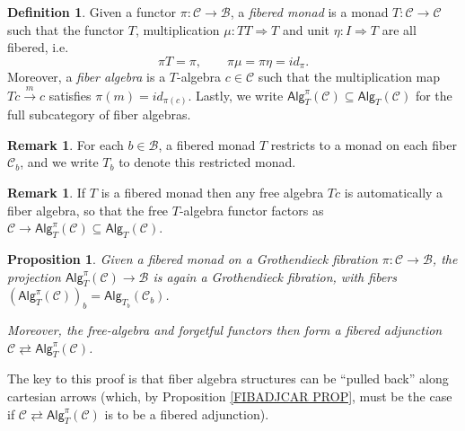 \documentclass[a4paper,10pt
]{article}%
\numberwithin{equation}{section}
\numberwithin{figure}{section}
\newtheorem{proposition}[equation]{Proposition}%
\theoremstyle{definition} %
\newtheorem{definition}[equation]{Definition}%
\newtheorem{remark}[equation]{Remark}%
\newcommand{\1}{\ensuremath{\mathbbm 1}}%
\begin{document}
\begin{definition}\label{FIBMON DEF}
	Given a functor $\pi \colon \mathcal{C} \to \mathcal{B}$,
	a \textit{fibered monad} is a monad $T \colon \mathcal{C} \to \mathcal{C}$ such that 
	the functor $T$,
	multiplication 
	$\mu \colon TT \Rightarrow T$
	and unit $\eta \colon I \Rightarrow T$
	are all fibered, i.e.
	\[
	\pi T = \pi,\qquad
	\pi\mu=\pi\eta=id_{\pi}.
	\]
	Moreover, a \textit{fiber algebra} is a $T$-algebra $c \in \mathcal{C}$
	such that the multiplication map
	$Tc \xrightarrow{m} c$ satisfies 
	$\pi(m)=id_{\pi(c)}$.
	Lastly, we write $\mathsf{Alg}^{\pi}_T(\mathcal{C}) \subseteq \mathsf{Alg}_T(\mathcal{C})$ for the full subcategory of fiber algebras.
\end{definition}


\begin{remark}
        \label{MONFIB_REM}
	For each $b\in \mathcal{B}$, a fibered monad $T$ restricts to a monad on each fiber $\mathcal{C}_b$, and we write $T_b$ to denote this restricted monad.
\end{remark}


\begin{remark}
	If $T$ is a fibered monad then any free algebra $Tc$ is automatically a fiber algebra, so that the free $T$-algebra functor factors
	as 
	$\mathcal{C} \to \mathsf{Alg}^{\pi}_T(\mathcal{C}) \subseteq \mathsf{Alg}_T(\mathcal{C})$.
\end{remark}



\begin{proposition}\label{FIBALGGR PROP}
	Given a fibered monad on a Grothendieck fibration $\pi \colon \mathcal{C} \to \mathcal{B}$,
	the projection $\mathsf{Alg}^{\pi}_T(\mathcal{C}) \to \mathcal{B}$
	is again a Grothendieck fibration, with fibers
	$\left(\mathsf{Alg}^{\pi}_T(\mathcal C)\right)_b = \mathsf{Alg}_{T_b}(\mathcal C_b)$.
	
	Moreover, the free-algebra and forgetful functors then form a fibered adjunction
	$\mathcal{C} \rightleftarrows \mathsf{Alg}^{\pi}_T(\mathcal{C})$.
\end{proposition}


The key to this proof is that fiber algebra structures can be ``pulled back'' along cartesian arrows
(which, by Proposition \ref{FIBADJCAR PROP}, must be the case if $\mathcal{C} \rightleftarrows \mathsf{Alg}^{\pi}_T(\mathcal{C})$ is to be a fibered adjunction). 
\end{document}
